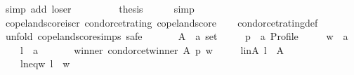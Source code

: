 \begin{isabellebody}
\ {\isacharparenleft}{\kern0pt}simp\ add{\isacharcolon}{\kern0pt}\ loser{\isacharparenright}{\kern0pt}\isanewline
\ \ \isamarkupfalse%
\ {}\ {}\isanewline
\ \ \isamarkupfalse%
\ {\isacharquery}{\kern0pt}thesis\isanewline
\ \ \ \ \isamarkupfalse%
\ simp\isanewline
{}\isamarkupfalse%
%
\endisatagproof
{\isafoldproof}%
%
\isadelimproof
%
\endisadelimproof
%
\isadelimdocument
%
\endisadelimdocument
%
\isatagdocument
%
\isamarkuptrue%
%
\endisatagdocument
{\isafolddocument}%
%
\isadelimdocument
%
\endisadelimdocument
{}\isamarkupfalse%
\ copeland{\isacharunderscore}{\kern0pt}score{\isacharunderscore}{\kern0pt}is{\isacharunderscore}{\kern0pt}cr{\isacharcolon}{\kern0pt}\ {\isachardoublequoteopen}condorcet{\isacharunderscore}{\kern0pt}rating\ copeland{\isacharunderscore}{\kern0pt}score{\isachardoublequoteclose}\isanewline
%
\isadelimproof
\ \ %
\endisadelimproof
%
\isatagproof
{}\isamarkupfalse%
\ condorcet{\isacharunderscore}{\kern0pt}rating{\isacharunderscore}{\kern0pt}def\isanewline
{}\isamarkupfalse%
\ {\isacharparenleft}{\kern0pt}unfold\ copeland{\isacharunderscore}{\kern0pt}score{\isachardot}{\kern0pt}simps{\isacharcomma}{\kern0pt}\ safe{\isacharparenright}{\kern0pt}\isanewline
\ \ \isamarkupfalse%
\isanewline
\ \ \ \ A\ {\isacharcolon}{\kern0pt}{\isacharcolon}{\kern0pt}\ {\isachardoublequoteopen}{\isacharprime}{\kern0pt}a\ set{\isachardoublequoteclose}\ \isanewline
\ \ \ \ p\ {\isacharcolon}{\kern0pt}{\isacharcolon}{\kern0pt}\ {\isachardoublequoteopen}{\isacharprime}{\kern0pt}a\ Profile{\isachardoublequoteclose}\ \isanewline
\ \ \ \ w\ {\isacharcolon}{\kern0pt}{\isacharcolon}{\kern0pt}\ {\isachardoublequoteopen}{\isacharprime}{\kern0pt}a{\isachardoublequoteclose}\ \isanewline
\ \ \ \ l\ {\isacharcolon}{\kern0pt}{\isacharcolon}{\kern0pt}\ {\isachardoublequoteopen}{\isacharprime}{\kern0pt}a{\isachardoublequoteclose}\isanewline
\ \ \isamarkupfalse%
\isanewline
\ \ \ \ winner{\isacharcolon}{\kern0pt}\ {\isachardoublequoteopen}condorcet{\isacharunderscore}{\kern0pt}winner\ A\ p\ w{\isachardoublequoteclose}\ \isanewline
\ \ \ \ l{\isacharunderscore}{\kern0pt}in{\isacharunderscore}{\kern0pt}A{\isacharcolon}{\kern0pt}\ {\isachardoublequoteopen}l\ {\isasymin}\ A{\isachardoublequoteclose}\ \isanewline
\ \ \ \ l{\isacharunderscore}{\kern0pt}neq{\isacharunderscore}{\kern0pt}w{\isacharcolon}{\kern0pt}\ {\isachardoublequoteopen}l\ {\isasymnoteq}\ w{\isachardoublequoteclose}\isanewline

\end{isabellebody}
